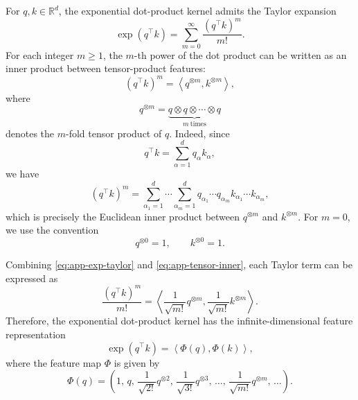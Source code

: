 \documentclass{article}
\newcommand{\R}{\mathbb{R}}
\begin{document}
For $q,k\in\R^d$, the exponential dot-product kernel admits the Taylor expansion
\begin{equation}
    \exp(q^\top k)
    =
    \sum_{m=0}^{\infty}
    \frac{(q^\top k)^m}{m!}.
    \label{eq:app-exp-taylor}
\end{equation}
For each integer $m\geq 1$, the $m$-th power of the dot product can be written as an inner product between tensor-product features:
\begin{equation}
    (q^\top k)^m
    =
    \left\langle
    q^{\otimes m},
    k^{\otimes m}
    \right\rangle,
    \label{eq:app-tensor-inner}
\end{equation}
where
\begin{equation}
    q^{\otimes m}
    =
    \underbrace{q\otimes q\otimes \cdots \otimes q}_{m\ \mathrm{times}}
\end{equation}
denotes the $m$-fold tensor product of $q$. 
Indeed, since
\begin{equation}
    q^\top k
    =
    \sum_{\alpha=1}^{d}q_\alpha k_\alpha,
\end{equation}
we have
\begin{equation}
    (q^\top k)^m
    =
    \sum_{\alpha_1=1}^{d}\cdots\sum_{\alpha_m=1}^{d}
    q_{\alpha_1}\cdots q_{\alpha_m}
    k_{\alpha_1}\cdots k_{\alpha_m},
\end{equation}
which is precisely the Euclidean inner product between $q^{\otimes m}$ and $k^{\otimes m}$. 
For $m=0$, we use the convention
\begin{equation}
    q^{\otimes 0}=1,
    \qquad
    k^{\otimes 0}=1.
\end{equation}

Combining \eqref{eq:app-exp-taylor} and \eqref{eq:app-tensor-inner}, each Taylor term can be expressed as
\begin{equation}
    \frac{(q^\top k)^m}{m!}
    =
    \left\langle
    \frac{1}{\sqrt{m!}}q^{\otimes m},
    \frac{1}{\sqrt{m!}}k^{\otimes m}
    \right\rangle.
    \label{eq:app-scaled-tensor-inner}
\end{equation}
Therefore, the exponential dot-product kernel has the infinite-dimensional feature representation
\begin{equation}
    \exp(q^\top k)
    =
    \left\langle
    \Phi(q),
    \Phi(k)
    \right\rangle,
    \label{eq:app-exp-feature-inner}
\end{equation}
where the feature map $\Phi$ is given by
\begin{equation}
    \Phi(q)
    =
    \left(
    1,\,
    q,\,
    \frac{1}{\sqrt{2!}}q^{\otimes 2},\,
    \frac{1}{\sqrt{3!}}q^{\otimes 3},\,
    \ldots,\,
    \frac{1}{\sqrt{m!}}q^{\otimes m},\,
    \ldots
    \right).
    \label{eq:app-infinite-feature-map}
\end{equation}
\end{document}
